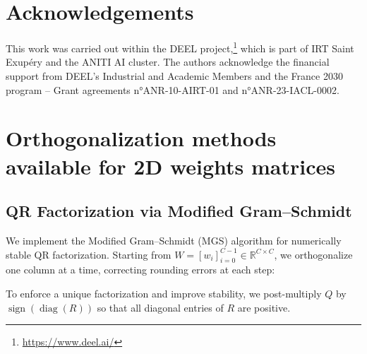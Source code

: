 \documentclass[10pt]{article}
\theoremstyle{plain}
\theoremstyle{definition}
\theoremstyle{remark}
\begin{document}
\section*{Acknowledgements}
This work was carried out within the DEEL project,\footnote{\url{https://www.deel.ai/}} which is part of IRT Saint Exupéry and the ANITI AI cluster. The authors acknowledge the financial support from DEEL's Industrial and Academic Members and the France 2030 program – Grant agreements n°ANR-10-AIRT-01 and n°ANR-23-IACL-0002.




\appendix

\newpage

\section{Orthogonalization methods available for 2D weights matrices}
\label{ap:matrix_orth_methods}
\subsection{QR Factorization via Modified Gram–Schmidt}

We implement the Modified Gram–Schmidt (MGS) algorithm \cite{LaPlace1820} for numerically stable QR factorization.  Starting from \(W=[w_i]_{i=0}^{C-1}\in\mathbb{R}^{C\times C}\), we orthogonalize one column at a time, correcting rounding errors at each step:


To enforce a unique factorization and improve stability, we post-multiply \(Q\) by \(\operatorname{sign}(\operatorname{diag}(R))\) so that all diagonal entries of \(R\) are positive.
\end{document}
